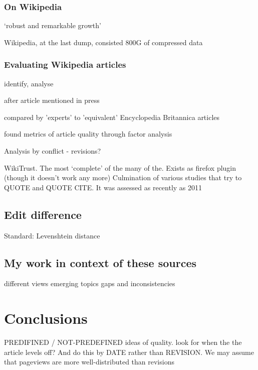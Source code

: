 \documentclass[a4paper,11pt,twoside,notitlepage]{article}
\begin{document}
        \subsubsection{On Wikipedia}
        `robust and remarkable growth'
        \cite{Kittur2007}\cite{Voss2005} 
        
        Wikipedia, at the last dump, consisted 800G of compressed data
        \cite{wiki-dump}

        \subsubsection{Evaluating Wikipedia articles}
        identify, analyse

        after article mentioned in press \cite{Lih2004}

        compared by 'experts' to 'equivalent' Encyclopedia Britannica articles \cite{Giles2005}

        found metrics of article quality through factor analysis
        \cite{Stvilia2005}

        Analysis by conflict - revisions?\cite{Kittur2007}

        WikiTrust. The most `complete' of the many of the. Exists as
        firefox plugin (though it doesn't work any more) Culmination
        of various studies that try to QUOTE \cite{Adler2007} and QUOTE CITE. It
        was assessed as recently as 2011 \cite{Lucassen2011}
       
        \subsection{Edit difference}

        Standard: Levenshtein distance \cite{Levenshtein1966}
        
        \subsection{My work in context of these sources}
        different views
        emerging topics
        gaps and inconsistencies

        \section{Conclusions}

        PREDIFINED / NOT-PREDEFINED ideas of quality. look for when
        the the article levels off? And do this by DATE rather than
        REVISION. We may assume that pageviews are more
        well-distributed than revisions
\end{document}
